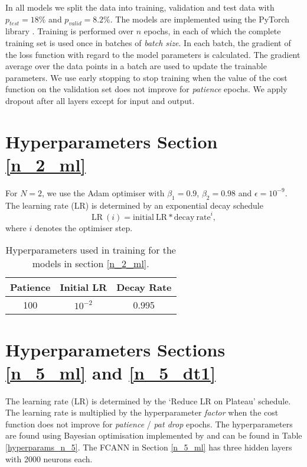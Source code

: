 In all models we split the data into training, validation and test data with $p_{test} = 18 \%$ and $p_{valid} = 8.2 \%$. 
The models are implemented using the PyTorch library \cite{NEURIPS2019_9015}. 
Training is performed over $n$ epochs, in each of which the complete training set is used once in batches of \textit{batch size}.
In each batch, the gradient of the loss function with regard to the model parameters is calculated.
The gradient average over the data points in a batch are used to update the trainable parameters.
We use early stopping to stop training when the value of the cost function on the validation set does not improve for \textit{patience} epochs.
We apply dropout \cite{hinton2012improving} after all layers except for input and output.

\section{Hyperparameters Section \ref{n_2_ml}}
For $N=2$, we use the Adam optimiser with $\beta_1 = 0.9$, $\beta_2 = 0.98$ and $\epsilon = 10^{-9}$. The learning rate (LR) is determined by an exponential decay schedule
\begin{equation} \label{eds}
\mathrm{LR} \ (i) = \mathrm{initial \ LR} * \mathrm{decay \ rate}^i,
\end{equation}
where $i$ denotes the optimiser step.


\begin{table}[h]
	\centering
	\begin{tabular}{c | c | c }
		Patience & Initial LR & Decay Rate \\
		\hline
		100 & $10^{-2}$ & 0.995 \\
	\end{tabular}
	\caption{Hyperparameters used in training for the models in section \ref{n_2_ml}.}
	\label{hyperparams_n_2}
\end{table}

\section{Hyperparameters Sections \ref{n_5_ml} and \ref{n_5_dt1}}
The learning rate (LR) is determined by the `Reduce LR on Plateau' schedule.
The learning rate is multiplied by the hyperparameter \textit{factor} when the cost function does not improve for \textit{patience} / \textit{pat drop} epochs.
The hyperparameters are found using Bayesian optimisation implemented by \cite{wandb} and can be found in Table \ref{hyperparams_n_5}.
The FCANN in Section \ref{n_5_ml} has three hidden layers with 2000 neurons each.

